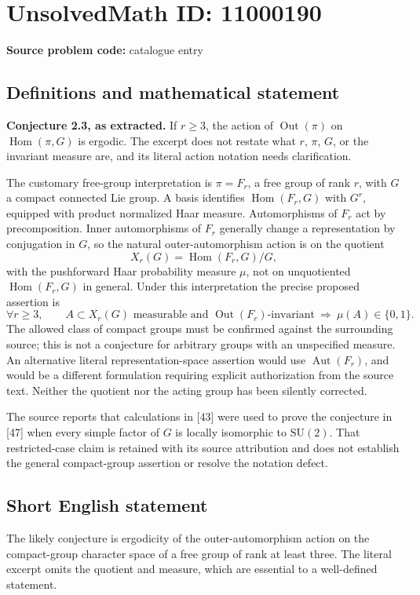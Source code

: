 \documentclass[11pt]{article}
\begin{document}
\section*{UnsolvedMath ID: 11000190}
\textbf{Source problem code:} catalogue entry
\subsection{Definitions and mathematical statement}
\textbf{Conjecture 2.3, as extracted.} If $r\ge3$, the action of $\operatorname{Out}(\pi)$ on $\operatorname{Hom}(\pi,G)$ is ergodic. The excerpt does not restate what $r$, $\pi$, $G$, or the invariant measure are, and its literal action notation needs clarification.

The customary free-group interpretation is $\pi=F_r$, a free group of rank $r$, with $G$ a compact connected Lie group. A basis identifies $\operatorname{Hom}(F_r,G)$ with $G^r$, equipped with product normalized Haar measure. Automorphisms of $F_r$ act by precomposition. Inner automorphisms of $F_r$ generally change a representation by conjugation in $G$, so the natural outer-automorphism action is on the quotient
\[
 X_r(G)=\operatorname{Hom}(F_r,G)/G,
\]
with the pushforward Haar probability measure $\mu$, not on unquotiented $\operatorname{Hom}(F_r,G)$ in general. Under this interpretation the precise proposed assertion is
\[
 \forall r\ge3,\qquad
 A\subset X_r(G)\text{ measurable and }\operatorname{Out}(F_r)\text{-invariant}
 \ \Longrightarrow\ \mu(A)\in\{0,1\}.
\]
The allowed class of compact groups must be confirmed against the surrounding source; this is not a conjecture for arbitrary groups with an unspecified measure. An alternative literal representation-space assertion would use $\operatorname{Aut}(F_r)$, and would be a different formulation requiring explicit authorization from the source text. Neither the quotient nor the acting group has been silently corrected.

The source reports that calculations in [43] were used to prove the conjecture in [47] when every simple factor of $G$ is locally isomorphic to $\mathrm{SU}(2)$. That restricted-case claim is retained with its source attribution and does not establish the general compact-group assertion or resolve the notation defect.
\subsection{Short English statement}
The likely conjecture is ergodicity of the outer-automorphism action on the compact-group character space of a free group of rank at least three. The literal excerpt omits the quotient and measure, which are essential to a well-defined statement.
\end{document}
